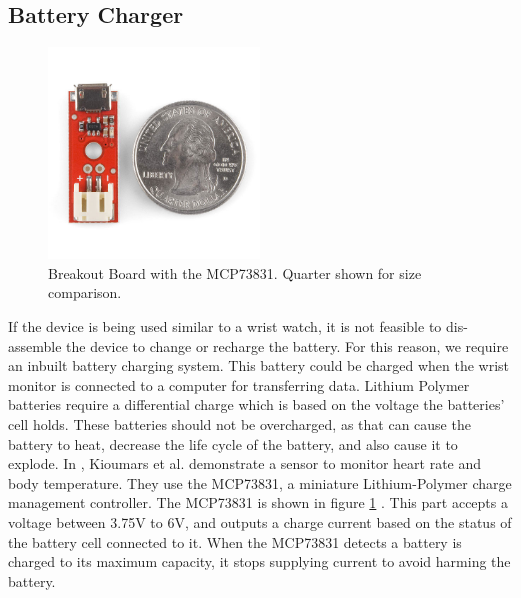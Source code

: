 \subsection{Battery Charger}
\label{Sec:BattCharger}
\begin{figure}
\begin{center}
\includegraphics[width=0.5\textwidth]{images/MCP73Breakout.jpg}
\caption{Breakout Board with the MCP73831. Quarter shown for size comparison.}
\label{Fig:MCPCharger}
\end{center}
\end{figure}
If the device is being used similar to a wrist watch,
it is not feasible to dis-assemble the device to change or recharge the battery.
For this reason, 
we require an inbuilt battery charging system.
This battery could be charged when the wrist monitor is connected to a computer for transferring data.
Lithium Polymer batteries require a differential charge which is based on the voltage the batteries' cell holds.
These batteries should not be overcharged, 
as that can cause the battery to heat,
decrease the life cycle of the battery,
and also cause it to explode.
In \cite{kioumars2011atmega}, Kioumars et al. demonstrate a sensor to monitor heart rate and body temperature.
They use the MCP73831, a miniature Lithium-Polymer charge management controller.
The MCP73831 is shown in figure \ref{Fig:MCPCharger} \cite{Web:MCPIC}.
This part accepts a voltage between 3.75V to 6V,
and outputs a charge current based on the status of the battery cell connected to it.
When the MCP73831 detects a battery is charged to its maximum capacity,
it stops supplying current to avoid harming the battery.

